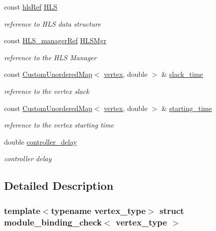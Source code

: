 \begin{DoxyCompactItemize}
const \hyperlink{hls_8hpp_a75d0c73923d0ddfa28c4843a802c73a7}{hls\+Ref} \hyperlink{structmodule__binding__check_a7f6156fe38737e4e19bdc9638c9a0395}{H\+LS}
\begin{DoxyCompactList}\small\item\em reference to H\+LS data structure \end{DoxyCompactList}\item 
const \hyperlink{hls__manager_8hpp_acd3842b8589fe52c08fc0b2fcc813bfe}{H\+L\+S\+\_\+manager\+Ref} \hyperlink{structmodule__binding__check_a71ccc2df21dfba5d88bd55b83d45d3bf}{H\+L\+S\+Mgr}
\begin{DoxyCompactList}\small\item\em reference to the H\+LS Manager \end{DoxyCompactList}\item 
const \hyperlink{custom__map_8hpp_ad1ed68f2ff093683ab1a33522b144adc}{Custom\+Unordered\+Map}$<$ \hyperlink{graph_8hpp_abefdcf0544e601805af44eca032cca14}{vertex}, double $>$ \& \hyperlink{structmodule__binding__check_a32b8f6bff5beb2a18a7ef2a0252536f2}{slack\+\_\+time}
\begin{DoxyCompactList}\small\item\em reference to the vertex slack \end{DoxyCompactList}\item 
const \hyperlink{custom__map_8hpp_ad1ed68f2ff093683ab1a33522b144adc}{Custom\+Unordered\+Map}$<$ \hyperlink{graph_8hpp_abefdcf0544e601805af44eca032cca14}{vertex}, double $>$ \& \hyperlink{structmodule__binding__check_a1d5792322e2f29615ff44bd2989812bc}{starting\+\_\+time}
\begin{DoxyCompactList}\small\item\em reference to the vertex starting time \end{DoxyCompactList}\item 
double \hyperlink{structmodule__binding__check_a3c463de0cce112e30192a1e10344fa74}{controller\+\_\+delay}
\begin{DoxyCompactList}\small\item\em controller delay \end{DoxyCompactList}\end{DoxyCompactItemize}


\subsection{Detailed Description}
\subsubsection*{template$<$typename vertex\+\_\+type$>$\newline
struct module\+\_\+binding\+\_\+check$<$ vertex\+\_\+type $>$}



